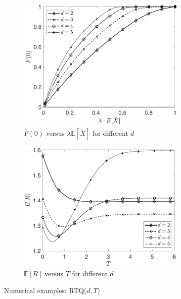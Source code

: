 \documentclass[12pt]{report}
\newcommand{\E}{\mathbb{E}}
\begin{document}
\begin{figure}[t]
	\begin{subfigure}{.44\textwidth}
		\begin{center}
		\includegraphics[width=0.9\textwidth]{figures/Chapter4/plot_Fbar0_RTQdT.pdf}
		\caption{$\bar{F}(0)$ versus $\lambda \E[\tilde{X}]$ for different $d$}
		\label{fig:RTQ1}
		\end{center}
	\end{subfigure}
	\begin{subfigure}{.44\textwidth}	
		\begin{center}
		\includegraphics[width=0.9\textwidth]{figures/Chapter4/plot_MRT_ifoT_RTQdT.pdf}
		\caption{$\E[R]$ versus $T$ for different $d$}
		\label{fig:RTQ2}
		\end{center}
	\end{subfigure}
	\caption{Numerical examples: RTQ($d,T$)}
\end{figure}
\end{document}
